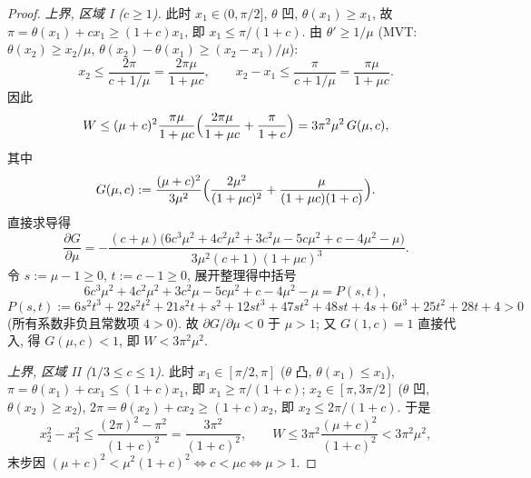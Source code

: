 \documentclass[UTF8]{ctexart}
\begin{document}
\begin{proof}
\emph{上界, 区域 I ($c\ge1$).} 此时 $x_1\in(0,\pi/2]$, $\theta$ 凹, $\theta(x_1)\ge x_1$,
故 $\pi=\theta(x_1)+cx_1\ge(1+c)x_1$, 即 $x_1\le\pi/(1+c)$.
由 $\theta'\ge1/\mu$ (MVT: $\theta(x_2)\ge x_2/\mu$, $\theta(x_2)-\theta(x_1)\ge(x_2-x_1)/\mu$):
\begin{equation}
	x_2\le\frac{2\pi}{c+1/\mu}=\frac{2\pi\mu}{1+\mu c},\qquad
	x_2-x_1\le\frac{\pi}{c+1/\mu}=\frac{\pi\mu}{1+\mu c}.
\end{equation}
因此
\begin{equation}
	W\le(\mu+c)^2\frac{\pi\mu}{1+\mu c}
	\Bigl(\frac{2\pi\mu}{1+\mu c}+\frac{\pi}{1+c}\Bigr)
	=3\pi^2\mu^2\,G(\mu,c),
\end{equation}
其中
\begin{equation}
	G(\mu,c):=\frac{(\mu+c)^2}{3\mu^2}
	\Bigl(\frac{2\mu^2}{(1+\mu c)^2}+\frac{\mu}{(1+\mu c)(1+c)}\Bigr).
\end{equation}
直接求导得
\begin{equation}
	\frac{\partial G}{\partial\mu}
	=-\frac{(c+\mu)\bigl(6c^3\mu^2+4c^2\mu^2+3c^2\mu-5c\mu^2+c-4\mu^2-\mu\bigr)}
	{3\mu^2(c+1)(1+\mu c)^3}.
\end{equation}
令 $s:=\mu-1\ge0$, $t:=c-1\ge0$, 展开整理得中括号
\begin{equation}
	6c^3\mu^2+4c^2\mu^2+3c^2\mu-5c\mu^2+c-4\mu^2-\mu=P(s,t),
\end{equation}
\begin{equation}
	P(s,t):=6s^2t^3+22s^2t^2+21s^2t+s^2+12st^3+47st^2+48st+4s
	+6t^3+25t^2+28t+4>0
\end{equation}
(所有系数非负且常数项 $4>0$). 故 $\partial G/\partial\mu<0$ 于 $\mu>1$;
又 $G(1,c)=1$ 直接代入, 得 $G(\mu,c)<1$, 即 $W<3\pi^2\mu^2$.

\emph{上界, 区域 II ($1/3\le c\le1$).} 此时 $x_1\in[\pi/2,\pi]$ ($\theta$ 凸,
$\theta(x_1)\le x_1$), $\pi=\theta(x_1)+cx_1\le(1+c)x_1$, 即 $x_1\ge\pi/(1+c)$;
$x_2\in[\pi,3\pi/2]$ ($\theta$ 凹, $\theta(x_2)\ge x_2$),
$2\pi=\theta(x_2)+cx_2\ge(1+c)x_2$, 即 $x_2\le2\pi/(1+c)$. 于是
\begin{equation}
	x_2^2-x_1^2\le\frac{(2\pi)^2-\pi^2}{(1+c)^2}=\frac{3\pi^2}{(1+c)^2},
	\qquad
	W\le 3\pi^2\frac{(\mu+c)^2}{(1+c)^2}<3\pi^2\mu^2,
\end{equation}
末步因 $(\mu+c)^2<\mu^2(1+c)^2\iff c<\mu c\iff \mu>1$.


\end{proof}
\end{document}
